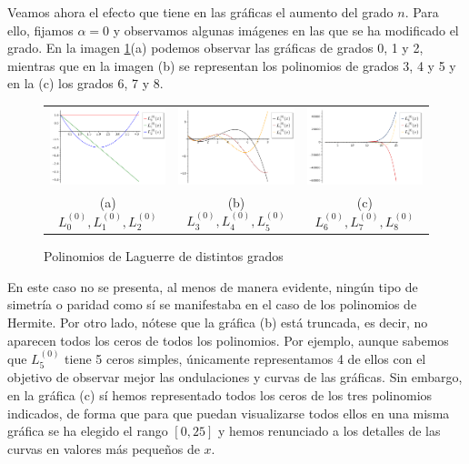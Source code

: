 Veamos ahora el efecto que tiene en las gráficas el aumento del grado $n$. Para ello, fijamos $\alpha=0$ y observamos algunas imágenes en las que se ha modificado el grado. En la imagen \ref{img:graficas-Laguerre-n}(a) podemos observar las gráficas de grados 0, 1 y 2, mientras que en la imagen (b) se representan los polinomios de grados 3, 4 y 5 y en la (c) los grados 6, 7 y 8.

\begin{figure}[h]
    \centering
    \begin{tabular}{ccc}
        \includegraphics[width=5cm]{img/C2/Laguerre4.png} & 
        \includegraphics[width=5cm]{img/C2/Laguerre5.png} &
        \includegraphics[width=5cm]{img/C2/Laguerre8.png} \\
        (a) $L_0^{(0)},L_1^{(0)},L_2^{(0)}$ & (b) $L_3^{(0)},L_4^{(0)},L_5^{(0)}$ & (c) $L_6^{(0)},L_7^{(0)},L_8^{(0)}$
    \end{tabular}
    \caption{Polinomios de Laguerre de distintos grados}
    \label{img:graficas-Laguerre-n}
\end{figure}

En este caso no se presenta, al menos de manera evidente, ningún tipo de simetría o paridad como sí se manifestaba en el caso de los polinomios de Hermite. Por otro lado, nótese que la gráfica (b) está truncada, es decir, no aparecen todos los ceros de todos los polinomios. Por ejemplo, aunque sabemos que $L_5^{(0)}$ tiene 5 ceros simples, únicamente representamos 4 de ellos con el objetivo de observar mejor las ondulaciones y curvas de las gráficas. Sin embargo, en la gráfica (c) sí hemos representado todos los ceros de los tres polinomios indicados, de forma que para que puedan visualizarse todos ellos en una misma gráfica se ha elegido el rango $[0,25]$ y hemos renunciado a los detalles de las curvas en valores más pequeños de $x$. 

